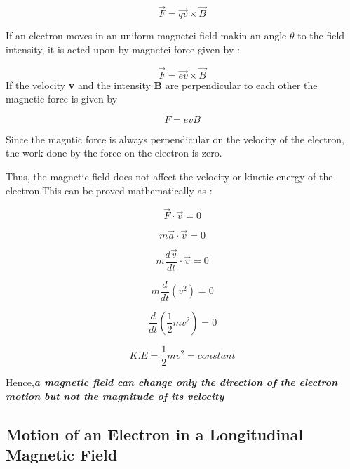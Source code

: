 \documentclass[a4paper,20pt,twoside]{report}
\begin{document}
	\begin{equation}
	\vec{F} = \vec{qv} \times \vec{B}
	\end{equation}
	
	If an electron moves in an uniform magnetci field makin an angle $\theta$ to the field intensity, it is acted upon by magnetci force given by : 
	
	\begin{equation}
	\vec{F} = \vec{ev} \times \vec{B}
	\end{equation}
	If the velocity \textbf{v} and the intensity \textbf{B} are perpendicular to each other the magnetic
	force is given by 
	
	\begin{equation}
	F = evB
	\end{equation}
	
	Since the magntic force is always perpendicular on the velocity of the electron, the work done by the force on the electron is zero.
	
	Thus, the magnetic field does not affect the velocity or kinetic energy of the electron.This can be proved mathematically as : 
	
	\begin{equation}
	\vec{F} \cdot \vec{v} = 0 
	\end{equation}
	
	\begin{equation}
	m\vec{a} \cdot  \vec{v} = 0
	\end{equation}
	
	\begin{equation}
	m\frac{d\vec{v}}{dt} \cdot \vec{v} = 0
	\end{equation}
	
	\begin{equation}
	m\frac{d}{dt}\left(v^2\right) = 0 
	\end{equation}
	
	\begin{equation}
	\frac{d}{dt}\left(\frac{1}{2}mv^2\right) = 0
	\end{equation}
	
	\begin{equation}
	K.E = \frac{1}{2}mv^2 = constant
	\end{equation}
	
	Hence,\textbf{\textit{a magnetic field can change only the direction of the electron motion but not the magnitude of its velocity}}
	
	\subsection{Motion of an Electron in a Longitudinal Magnetic Field}
	
\end{document}
